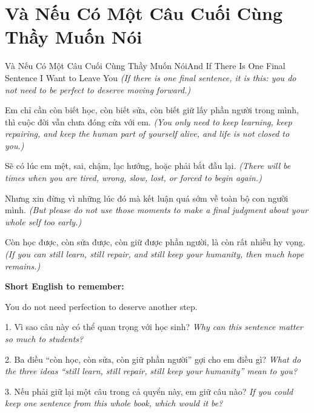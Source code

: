 \section{Và Nếu Có Một Câu Cuối Cùng Thầy Muốn Nói}
\begin{truyen}{Và Nếu Có Một Câu Cuối Cùng Thầy Muốn Nói}{And If There Is One Final Sentence I Want to Leave You}
\textit{(If there is one final sentence, it is this: you do not need to be perfect to deserve moving forward.)}

Em chỉ cần còn biết học, còn biết sửa, còn biết giữ lấy phần người trong mình, thì cuộc đời vẫn chưa đóng cửa với em.
\textit{(You only need to keep learning, keep repairing, and keep the human part of yourself alive, and life is not closed to you.)}

Sẽ có lúc em mệt, sai, chậm, lạc hướng, hoặc phải bắt đầu lại.
\textit{(There will be times when you are tired, wrong, slow, lost, or forced to begin again.)}

Nhưng xin đừng vì những lúc đó mà kết luận quá sớm về toàn bộ con người mình.
\textit{(But please do not use those moments to make a final judgment about your whole self too early.)}
\end{truyen}

\begin{baihoc}
Còn học được, còn sửa được, còn giữ được phần người, là còn rất nhiều hy vọng.
\textit{(If you can still learn, still repair, and still keep your humanity, then much hope remains.)}
\end{baihoc}

\begin{ghinhoanh}
\textbf{Short English to remember:}

You do not need perfection to deserve another step.

\end{ghinhoanh}

\begin{tuhocnhanh}
1. Vì sao câu này có thể quan trọng với học sinh? \textit{Why can this sentence matter so much to students?}

2. Ba điều “còn học, còn sửa, còn giữ phần người” gợi cho em điều gì? \textit{What do the three ideas “still learn, still repair, still keep your humanity” mean to you?}

3. Nếu phải giữ lại một câu trong cả quyển này, em giữ câu nào? \textit{If you could keep one sentence from this whole book, which would it be?}
\end{tuhocnhanh}
\ngancach

